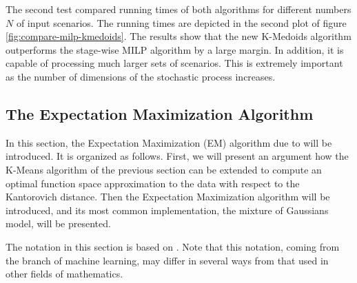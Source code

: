 The second test compared running times of both algorithms for different numbers $N$ of input scenarios.
The running times are depicted in the second plot of figure \ref{fig:compare-milp-kmedoids}.
The results show that the new K-Medoids algorithm outperforms the stage-wise MILP algorithm by a large margin.
In addition, it is capable of processing much larger sets of scenarios.
This is extremely important as the number of dimensions of the stochastic process increases.

\subsection{The Expectation Maximization Algorithm}
\label{sec:k-means-as-EM}
In this section, the Expectation Maximization (EM) algorithm due to  will be introduced.
It is organized as follows.
First, we will present an argument how the K-Means algorithm of the previous section can be extended to compute an optimal function space approximation to the data with respect to the Kantorovich distance.
Then the Expectation Maximization algorithm will be introduced, and its most common implementation, the mixture of Gaussians model, will be presented.

The notation in this section is based on .
Note that this notation, coming from the branch of machine learning, may differ in several ways from that used in other fields of mathematics.
